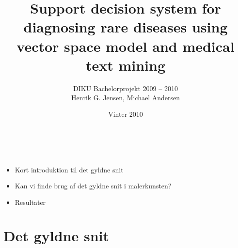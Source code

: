 \documentclass[xcolor=table]{beamer}
\title{Support decision system for diagnosing rare diseases using vector space model and medical text mining}
\subtitle{DIKU Bachelorprojekt 2009 -- 2010\\{\tiny Henrik G. Jensen, Michael Andersen}}
\author{}
\date{Vinter 2010}
\begin{document}
\begin{frame}
    \titlepage
\end{frame}

\section[Oversigt]{}
\begin{frame}

    \frametitle{\ }

    \begin{itemize}
        \item Kort introduktion til det gyldne snit
        \item Kan vi finde brug af det gyldne snit i malerkunsten?
        \item Resultater
    \end{itemize}

\end{frame}

\section{Det gyldne snit}
\subsection*{}
\end{document}
